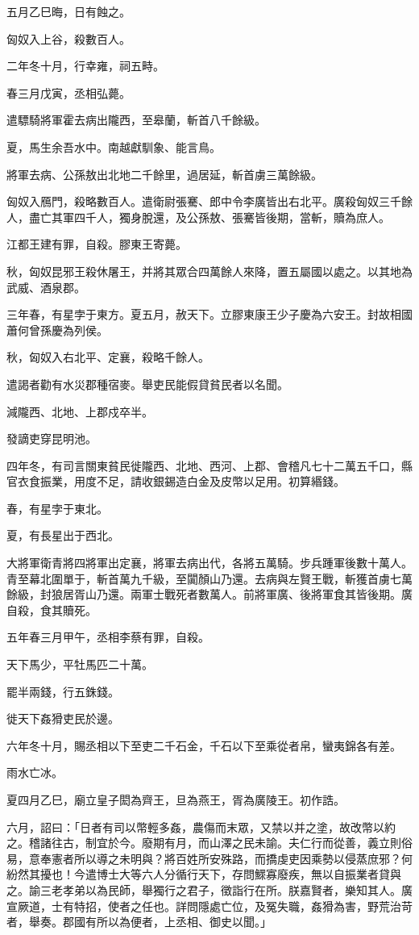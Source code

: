 \begin{pinyinscope}
五月乙巳晦，日有蝕之。

匈奴入上谷，殺數百人。

二年冬十月，行幸雍，祠五畤。

春三月戊寅，丞相弘薨。

遣驃騎將軍霍去病出隴西，至皋蘭，斬首八千餘級。

夏，馬生余吾水中。南越獻馴象、能言鳥。

將軍去病、公孫敖出北地二千餘里，過居延，斬首虜三萬餘級。

匈奴入鴈門，殺略數百人。遣衛尉張騫、郎中令李廣皆出右北平。廣殺匈奴三千餘人，盡亡其軍四千人，獨身脫還，及公孫敖、張騫皆後期，當斬，贖為庶人。

江都王建有罪，自殺。膠東王寄薨。

秋，匈奴昆邪王殺休屠王，并將其眾合四萬餘人來降，置五屬國以處之。以其地為武威、酒泉郡。

三年春，有星孛于東方。夏五月，赦天下。立膠東康王少子慶為六安王。封故相國蕭何曾孫慶為列侯。

秋，匈奴入右北平、定襄，殺略千餘人。

遣謁者勸有水災郡種宿麥。舉吏民能假貸貧民者以名聞。

減隴西、北地、上郡戍卒半。

發謫吏穿昆明池。

四年冬，有司言關東貧民徙隴西、北地、西河、上郡、會稽凡七十二萬五千口，縣官衣食振業，用度不足，請收銀錫造白金及皮幣以足用。初算緡錢。

春，有星孛于東北。

夏，有長星出于西北。

大將軍衛青將四將軍出定襄，將軍去病出代，各將五萬騎。步兵踵軍後數十萬人。青至幕北圍單于，斬首萬九千級，至闐顏山乃還。去病與左賢王戰，斬獲首虜七萬餘級，封狼居胥山乃還。兩軍士戰死者數萬人。前將軍廣、後將軍食其皆後期。廣自殺，食其贖死。

五年春三月甲午，丞相李蔡有罪，自殺。

天下馬少，平牡馬匹二十萬。

罷半兩錢，行五銖錢。

徙天下姦猾吏民於邊。

六年冬十月，賜丞相以下至吏二千石金，千石以下至乘從者帛，蠻夷錦各有差。

雨水亡冰。

夏四月乙巳，廟立皇子閎為齊王，旦為燕王，胥為廣陵王。初作誥。

六月，詔曰：「日者有司以幣輕多姦，農傷而末眾，又禁以并之塗，故改幣以約之。稽諸往古，制宜於今。廢期有月，而山澤之民未諭。夫仁行而從善，義立則俗易，意奉憲者所以導之未明與？將百姓所安殊路，而撟虔吏因乘勢以侵蒸庶邪？何紛然其擾也！今遣博士大等六人分循行天下，存問鰥寡廢疾，無以自振業者貸與之。諭三老孝弟以為民師，舉獨行之君子，徵詣行在所。朕嘉賢者，樂知其人。廣宣厥道，士有特招，使者之任也。詳問隱處亡位，及冤失職，姦猾為害，野荒治苛者，舉奏。郡國有所以為便者，上丞相、御史以聞。」


\end{pinyinscope}
